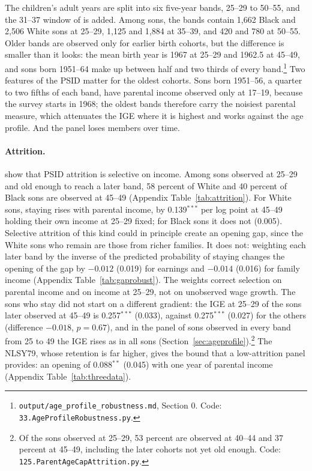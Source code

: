 The children's adult years are split into six five-year bands, 25--29 to 50--55, and the 31--37 window of
\citet{chetty2020race} is added. Among sons, the bands contain 1,662 Black and 2,506 White sons at 25--29, 1,125 and
1,884 at 35--39, and 420 and 780 at 50--55. Older bands are observed only for earlier birth cohorts, but the
difference is smaller than it looks: the mean birth year is 1967 at 25--29 and 1962.5 at 45--49, and sons born 1951--64
make up between half and two thirds of every band.\footnote{\texttt{output/age\_profile\_robustness.md}, Section 0.
Code: \texttt{33.AgeProfileRobustness.py}.} Two features of the PSID matter for the oldest cohorts. Sons born
1951--56, a quarter to two fifths of each band, have parental income observed only at 17--19, because the survey starts
in 1968; the oldest bands therefore carry the noisiest parental measure, which attenuates the IGE where it is highest
and works against the age profile. And the panel loses members over time.

\paragraph{Attrition.} \citet{fitzgerald1998analysis} show that PSID attrition is selective on income. Among sons
observed at 25--29 and old enough to reach a later band, 58 percent of White and 40 percent of Black sons are observed
at 45--49 (Appendix Table~\ref{tab:attrition}). For White sons, staying rises with parental income, by 0.139$^{***}$ per log
point at 45--49 holding their own income at 25--29 fixed; for Black sons it does not (0.005). Selective attrition of
this kind could in principle create an opening gap, since the White sons who remain are those from richer families. It
does not: weighting each later band by the inverse of the predicted probability of staying changes the opening of
the gap by $-0.012$ (0.019) for earnings and $-0.014$ (0.016) for family income (Appendix Table~\ref{tab:gaprobust}). The
weights correct selection on parental income and on income at 25--29, not on unobserved wage growth. The sons who stay
did not start on a different gradient: the IGE at 25--29 of the sons later observed at 45--49 is 0.257$^{***}$ (0.033),
against 0.275$^{***}$ (0.027) for the others (difference $-0.018$, $p = 0.67$), and in the panel of sons observed in
every band from 25 to 49 the IGE rises as in all sons (Section~\ref{sec:ageprofile}).\footnote{Of the sons observed at
25--29, 53 percent are observed at 40--44 and 37 percent at 45--49, including the later cohorts not yet old enough.
Code: \texttt{125.ParentAgeCapAttrition.py}.} The NLSY79, whose
retention is far higher, gives the bound that a low-attrition panel provides: an opening of 0.088$^{**}$ (0.045) with
one year of parental income (Appendix Table~\ref{tab:threedata}).


